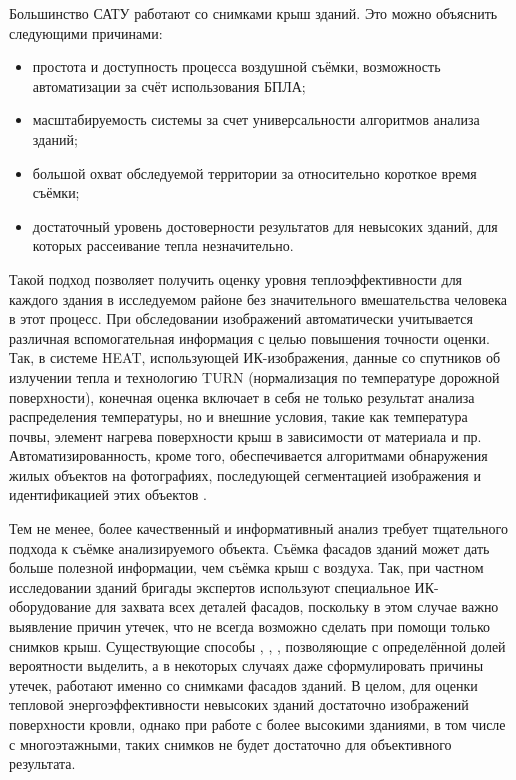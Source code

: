 	Большинство САТУ работают со снимками крыш зданий. Это можно объяснить следующими причинами:
	\begin{itemize}
		\item простота и доступность процесса воздушной съёмки, возможность автоматизации за счёт использования БПЛА;
		\item масштабируемость системы за счет универсальности алгоритмов анализа зданий;
		\item большой охват обследуемой территории за относительно короткое время съёмки;
		\item достаточный уровень достоверности результатов для невысоких зданий, для которых рассеивание тепла незначительно.
	\end{itemize}

	Такой подход позволяет получить оценку уровня теплоэффективности для каждого здания в исследуемом районе без значительного вмешательства человека в этот процесс. При обследовании изображений автоматически учитывается различная вспомогательная информация с целью повышения точности оценки. Так, в системе HEAT, использующей ИК-изображения, данные со спутников об излучении тепла и технологию {TURN} (нормализация по температуре дорожной поверхности), конечная оценка включает в себя не только результат анализа распределения температуры, но и внешние условия, такие как температура почвы, элемент нагрева поверхности крыш в зависимости от материала и пр. Автоматизированность, кроме того, обеспечивается алгоритмами обнаружения жилых объектов на фотографиях, последующей сегментацией изображения и идентификацией этих объектов \cite{problem:heat}.

	Тем не менее, более качественный и информативный анализ требует тщательного подхода к съёмке анализируемого объекта. Съёмка фасадов зданий может дать больше полезной информации, чем съёмка крыш с воздуха. Так, при частном исследовании зданий бригады экспертов используют специальное ИК-оборудование для захвата всех деталей фасадов, поскольку в этом случае важно выявление причин утечек, что не всегда возможно сделать при помощи только снимков крыш. Существующие способы \cite{problem:detection-windows-doors}, \cite{problem:aerial-oblique}, \cite{problem:thermal-leakages-facades}, позволяющие с определённой долей вероятности выделить, а в некоторых случаях даже сформулировать \cite{problem:knowledge-based-system} причины утечек, работают именно со снимками фасадов зданий. В целом, для оценки тепловой энергоэффективности невысоких зданий достаточно изображений поверхности кровли, однако при работе с более высокими зданиями, в том числе с многоэтажными, таких снимков не будет достаточно для объективного результата. 

